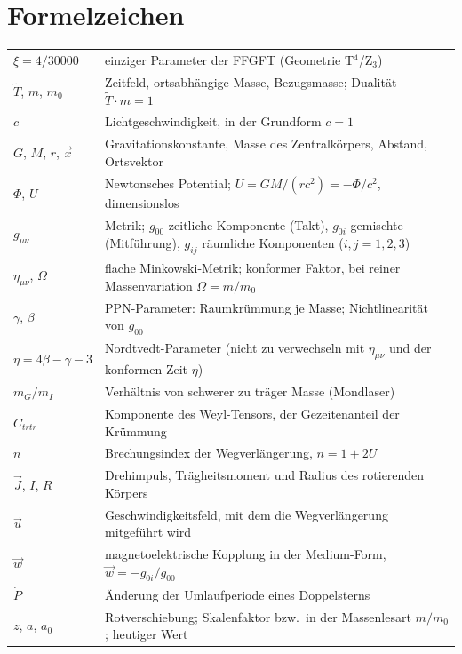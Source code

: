 \section*{Formelzeichen}
\begin{center}
\small
\begin{tabular}{@{}p{3.3cm}p{11.2cm}@{}}
\toprule
$\xi=4/30000$ & einziger Parameter der FFGFT (Geometrie T$^4$/Z$_3$) \\
$\tilde T$, $m$, $m_0$ & Zeitfeld, ortsabhängige Masse, Bezugsmasse; Dualität $\tilde T\cdot m=1$ \\
$c$ & Lichtgeschwindigkeit, in der Grundform $c=1$ \\
$G$, $M$, $r$, $\vec x$ & Gravitationskonstante, Masse des Zentralkörpers, Abstand, Ortsvektor \\
$\Phi$, $U$ & Newtonsches Potential; $U=GM/(rc^2)=-\Phi/c^2$, dimensionslos \\
$g_{\mu\nu}$ & Metrik; $g_{00}$ zeitliche Komponente (Takt), $g_{0i}$ gemischte (Mitführung),
$g_{ij}$ räumliche Komponenten ($i,j=1,2,3$) \\
$\eta_{\mu\nu}$, $\Omega$ & flache Minkowski-Metrik; konformer Faktor, bei reiner Massenvariation
$\Omega=m/m_0$ \\
$\gamma$, $\beta$ & PPN-Parameter: Raumkrümmung je Masse; Nichtlinearität von $g_{00}$ \\
$\eta=4\beta-\gamma-3$ & Nordtvedt-Parameter (nicht zu verwechseln mit $\eta_{\mu\nu}$ und der
konformen Zeit $\eta$) \\
$m_G/m_I$ & Verhältnis von schwerer zu träger Masse (Mondlaser) \\
$C_{trtr}$ & Komponente des Weyl-Tensors, der Gezeitenanteil der Krümmung \\
$n$ & Brechungsindex der Wegverlängerung, $n=1+2U$ \\
$\vec J$, $I$, $R$ & Drehimpuls, Trägheitsmoment und Radius des rotierenden Körpers \\
$\vec u$ & Geschwindigkeitsfeld, mit dem die Wegverlängerung mitgeführt wird \\
$\vec w$ & magnetoelektrische Kopplung in der Medium-Form, $\vec w=-g_{0i}/g_{00}$ \\
$\dot P$ & Änderung der Umlaufperiode eines Doppelsterns \\
$z$, $a$, $a_0$ & Rotverschiebung; Skalenfaktor bzw.\ in der Massenlesart $m/m_0$; heutiger Wert \\

\end{tabular}
\end{center}
